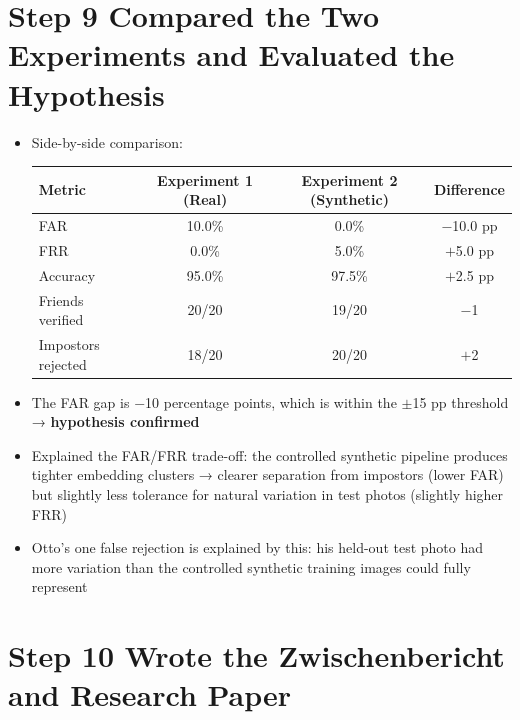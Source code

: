 \documentclass[11pt,a4paper]{article}
\begin{document}
\section*{Step 9 \quad Compared the Two Experiments and Evaluated the Hypothesis}

\begin{itemize}
    \item Side-by-side comparison:

    \vspace{6pt}
    \begin{center}
    \begin{tabular}{lccc}
    \toprule
    Metric & Experiment 1 (Real) & Experiment 2 (Synthetic) & Difference \\
    \midrule
    FAR & 10.0\% & 0.0\% & $-$10.0 pp \\
    FRR & 0.0\%  & 5.0\% & $+$5.0 pp \\
    Accuracy & 95.0\% & 97.5\% & $+$2.5 pp \\
    Friends verified & 20/20 & 19/20 & $-$1 \\
    Impostors rejected & 18/20 & 20/20 & $+$2 \\
    \bottomrule
    \end{tabular}
    \end{center}
    \vspace{6pt}

    \item The FAR gap is $-$10 percentage points, which is within the $\pm$15 pp threshold → \textbf{hypothesis confirmed}
    \item Explained the FAR/FRR trade-off: the controlled synthetic pipeline produces tighter embedding clusters → clearer separation from impostors (lower FAR) but slightly less tolerance for natural variation in test photos (slightly higher FRR)
    \item Otto's one false rejection is explained by this: his held-out test photo had more variation than the controlled synthetic training images could fully represent
\end{itemize}

\section*{Step 10 \quad Wrote the Zwischenbericht and Research Paper}
\end{document}
